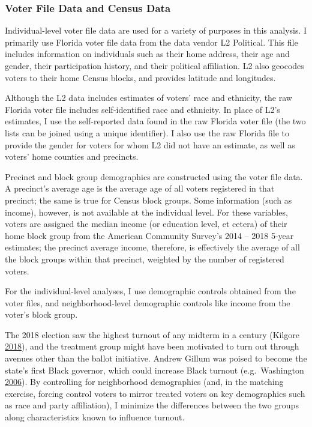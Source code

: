 \documentclass[
  12pt,
]{article}
\begin{document}
\hypertarget{voter-file-data-and-census-data}{%
\subsubsection*{Voter File Data and Census Data}\label{voter-file-data-and-census-data}}

Individual-level voter file data are used for a variety of purposes in this analysis. I primarily use Florida voter file data from the data vendor L2 Political. This file includes information on individuals such as their home address, their age and gender, their participation history, and their political affiliation. L2 also geocodes voters to their home Census blocks, and provides latitude and longitudes.

Although the L2 data includes estimates of voters' race and ethnicity, the raw Florida voter file includes self-identified race and ethnicity. In place of L2's estimates, I use the self-reported data found in the raw Florida voter file (the two lists can be joined using a unique identifier). I also use the raw Florida file to provide the gender for voters for whom L2 did not have an estimate, as well as voters' home counties and precincts.

Precinct and block group demographics are constructed using the voter file data. A precinct's average age is the average age of all voters registered in that precinct; the same is true for Census block groups. Some information (such as income), however, is not available at the individual level. For these variables, voters are assigned the median income (or education level, et cetera) of their home block group from the American Community Survey's 2014 -- 2018 5-year estimates; the precinct average income, therefore, is effectively the average of all the block groups within that precinct, weighted by the number of registered voters.

For the individual-level analyses, I use demographic controls obtained from the voter files, and neighborhood-level demographic controls like income from the voter's block group.

The 2018 election saw the highest turnout of any midterm in a century (Kilgore \protect\hyperlink{ref-Kilgore2018}{2018}), and the treatment group might have been motivated to turn out through avenues other than the ballot initiative. Andrew Gillum was poised to become the state's first Black governor, which could increase Black turnout (e.g.~Washington \protect\hyperlink{ref-Washington2006}{2006}). By controlling for neighborhood demographics (and, in the matching exercise, forcing control voters to mirror treated voters on key demographics such as race and party affiliation), I minimize the differences between the two groups along characteristics known to influence turnout.
\end{document}
